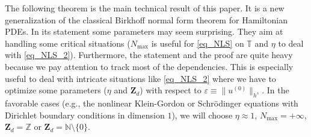 \documentclass[11pt]{article}
\newcommand{\eg}{e.g.,\xspace}
\theoremstyle{definition}
\begin{document}
\label{sec_BNF_LR}

The following theorem is the main technical result of this paper. It is a new generalization of the classical Birkhoff normal form theorem for Hamiltonian PDEs. In its statement some parameters may seem surprising. They aim at handling some critical situations ($N_{\max}$ is useful for \eqref{eq_NLS} on $\mathbb{T}$ and $\eta$ to deal with \eqref{eq_NLS_2}). Furthermore, the statement and the proof are quite heavy because we pay attention to track most of the dependencies. This is especially useful to deal with intricate situations like \eqref{eq_NLS_2} where we have to optimize some parameters ($\eta$ and $\mathbf{Z}_d$) with respect to $\varepsilon \equiv \|u^{(0)} \|_{h^s}$. In the favorable cases (\eg the nonlinear Klein-Gordon or Schrödinger equations with Dirichlet boundary conditions in dimension $1$), we will choose $\eta\approx 1$, $N_{\max}=+\infty$, $\mathbf{Z}_d = \mathbb{Z}$ or $\mathbf{Z}_d = \mathbb{N}\setminus \{0\}$.
\end{document}
